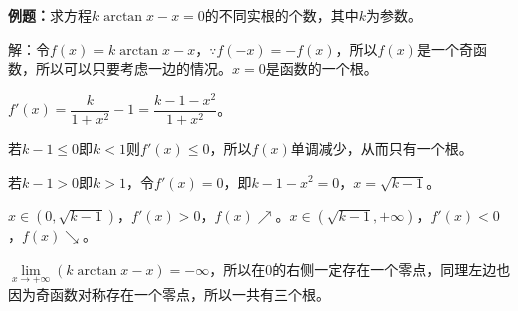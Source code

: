 \documentclass[UTF8, 12pt]{ctexart}
\begin{document}
\textbf{例题：}求方程$k\arctan x-x=0$的不同实根的个数，其中$k$为参数。

解：令$f(x)=k\arctan x-x$$，\because f(-x)=-f(x)$，所以$f(x)$是一个奇函数，所以可以只要考虑一边的情况。$x=0$是函数的一个根。

$f'(x)=\dfrac{k}{1+x^2}-1=\dfrac{k-1-x^2}{1+x^2}$。

若$k-1\leqslant0$即$k<1$则$f'(x)\leqslant0$，所以$f(x)$单调减少，从而只有一个根。

若$k-1>0$即$k>1$，令$f'(x)=0$，即$k-1-x^2=0$，$x=\sqrt{k-1}$。

$x\in(0,\sqrt{k-1})$，$f'(x)>0$，$f(x)\nearrow$。$x\in(\sqrt{k-1},+\infty)$，$f'(x)<0$，$f(x)\searrow$。

$\lim\limits_{x\to+\infty}(k\arctan x-x)=-\infty$，所以在0的右侧一定存在一个零点，同理左边也因为奇函数对称存在一个零点，所以一共有三个根。
\end{document}
